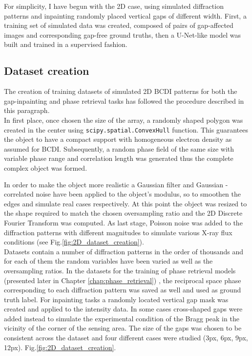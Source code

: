 For simplicity, I have begun with the 2D case, using simulated diffraction patterns and inpainting randomly placed 
vertical gaps of different width. First, a training set of simulated data was created, composed of pairs of gap-affected 
images and corresponding gap-free ground truths, then a U-Net-like model was built and trained in a supervised fashion.

\subsection{Dataset creation}\label{sec:dataset_creation2D}

The creation of training datasets of simulated 2D BCDI patterns for both the gap-inpainting and phase retrieval tasks has followed the procedure
described in this paragraph.\\
In first place, once chosen the size of the array, a randomly shaped polygon was created in the center using 
\texttt{scipy.spatial.ConvexHull} function. This guarantees the object to have a compact support with homogeneous electron 
density as assumed for BCDI. Subsequently, a random phase field of the same size with variable phase range and correlation 
length was generated thus the complete complex object was formed.

In order to make the object more realistic a Gaussian filter and Gaussian - correlated noise \cite{Gaussian_noise1984} 
have been applied to the 
object's modulus, so to smoothen the edges and simulate real cases respectively. At this point the object was resized 
to the shape required to match the chosen oversampling ratio and the 2D Discrete Fourier Transform was computed. As 
last stage, Poisson noise was added to the diffraction patterns with different magnitudes to simulate 
various X-ray flux conditions (see Fig.\ref{fig:2D_dataset_creation}). \\
Datasets contain a number of diffraction patterns in the order of thousands and for each of them the random variables 
have been varied as well as the oversampling ratios. In the datasets for the training of phase retrieval models (presented 
later in Chapter \ref{chap:phase_retrieval}) , 
the reciprocal space phase corresponding to each diffraction pattern was saved as well and used as ground truth label. 
For inpainting tasks a randomly located vertical gap mask was created and applied to the intensity data. In some cases 
cross-shaped gaps were added instead to simulate the experimental condition of the Bragg peak in the vicinity of the 
corner of the sensing area. The size of the gaps was chosen to be consistent across the dataset and four different 
cases were studied (3px, 6px, 9px, 12px). Fig.\ref{fig:2D_dataset_creation}. 

